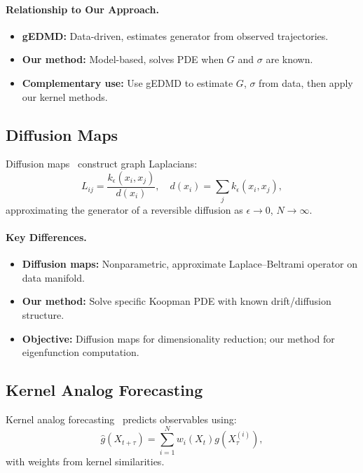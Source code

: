\documentclass[11pt,a4paper]{article}
\begin{document}
\paragraph{Relationship to Our Approach.}
\begin{itemize}
\item \textbf{gEDMD:} Data-driven, estimates generator from observed trajectories.
\item \textbf{Our method:} Model-based, solves PDE when $G$ and $\sigma$ are known.
\item \textbf{Complementary use:} Use gEDMD to estimate $G$, $\sigma$ from data, then apply our kernel methods.
\end{itemize}

\subsection{Diffusion Maps}

Diffusion maps~\cite{Coifman2006} construct graph Laplacians:
\begin{equation}
L_{ij} = \frac{k_\epsilon(x_i, x_j)}{d(x_i)}, \quad d(x_i) = \sum_j k_\epsilon(x_i, x_j),
\end{equation}
approximating the generator of a reversible diffusion as $\epsilon \to 0$, $N \to \infty$.

\paragraph{Key Differences.}
\begin{itemize}
\item \textbf{Diffusion maps:} Nonparametric, approximate Laplace--Beltrami operator on data manifold.
\item \textbf{Our method:} Solve specific Koopman PDE with known drift/diffusion structure.
\item \textbf{Objective:} Diffusion maps for dimensionality reduction; our method for eigenfunction computation.
\end{itemize}

\subsection{Kernel Analog Forecasting}

Kernel analog forecasting~\cite{Alexander2020} predicts observables using:
\begin{equation}
\widehat{g}(X_{t+\tau}) = \sum_{i=1}^N w_i(X_t) g(X_\tau^{(i)}),
\end{equation}
with weights from kernel similarities.
\end{document}
